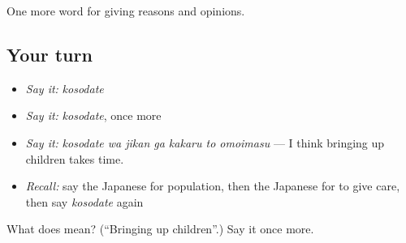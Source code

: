 \begin{grammarlens}[title={What you've built}]
One more word for giving reasons and opinions.
\end{grammarlens}

\subsection*{Your turn}
\begin{itemize}
\raggedright
  \item \emph{Say it:} \emph{kosodate}
  \item \emph{Say it:} \emph{kosodate}, once more
  \item \emph{Say it:} \emph{kosodate wa jikan ga kakaru to omoimasu} — I think bringing up children takes time.
  \item \emph{Recall:} say the Japanese for population, then the Japanese for to give care, then say \emph{kosodate} again
\end{itemize}

\begin{tcolorbox}[breakable,colback=teal!4,colframe=teal!35!black,title={Before you move on}]
What does  mean? (\textquotedblleft{}Bringing up children\textquotedblright{}.) Say it once more.
\end{tcolorbox}
